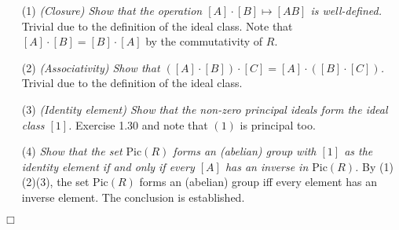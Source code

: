 \documentclass{article}
\begin{document}
\begin{enumerate}
\item[(1)]
\emph{(Closure) Show that the operation $[A] \cdot [B] \mapsto [AB]$ is well-defined. }
Trivial due to the definition of the ideal class.
Note that $[A] \cdot [B] = [B] \cdot [A]$ by the commutativity of $R$.
\item[(2)]
\emph{(Associativity) Show that $([A] \cdot [B]) \cdot [C] = [A] \cdot ([B] \cdot [C])$. }
Trivial due to the definition of the ideal class.
\item[(3)]
\emph{(Identity element) Show that the non-zero principal ideals form the ideal class $[1]$. }
Exercise 1.30 and note that $(1)$ is principal too.
\item[(4)]
\emph{Show that the set $\text{Pic}(R)$ forms an (abelian) group with $[1]$
as the identity element if and only if every $[A]$ has an inverse in $\text{Pic}(R)$.}
By (1)(2)(3), the set $\text{Pic}(R)$ forms an (abelian) group iff
every element has an inverse element. The conclusion is established.
\end{enumerate}
$\Box$ \\\\




\end{document}
